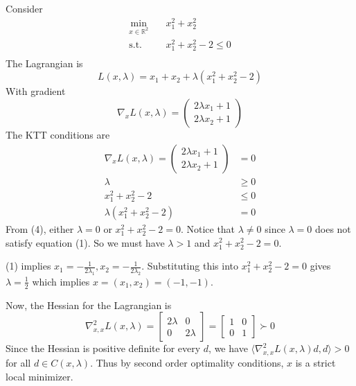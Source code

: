 \begin{example}
    Consider 
    \begin{align*}
        \min_{x \in \mathbb R^2} \quad &x_1^2 + x_2^2 \\
        \text{s.t.} \quad &x_1^2 + x_2^2 - 2\leq 0 \\
    \end{align*}
    The Lagrangian is $$L(x, \lambda) = x_1 + x_2 + \lambda(x_1^2 + x_2^2 - 2)$$
    With gradient
    $$\nabla_x L(x, \lambda) = \begin{pmatrix}
        2\lambda x_1 + 1 \\
        2\lambda x_2 + 1
    \end{pmatrix} $$
    The KTT conditions are 
    \begin{align*}
        \nabla_x L(x, \lambda) = \begin{pmatrix}
            2\lambda x_1 + 1 \\
            2\lambda x_2 + 1
        \end{pmatrix} &= 0 \tag{1}\\
        \lambda &\geq 0 \tag{2}\\
        x_1^2 + x_2^2 - 2 &\leq 0 \tag{3}\\
        \lambda(x_1^2 + x_2^2 - 2) &= 0 \tag{4}
    \end{align*}
    From (4), either $\lambda = 0$ or $x_1^2 + x_2^2 - 2 = 0$. Notice that $\lambda \neq 0$ since $\lambda = 0$ does not satisfy equation (1). So we must have $\lambda > 1$ and $x_1^2 + x_2^2 - 2 = 0$. 
    
    \bigskip 
    (1) implies $x_1 = - \frac{1}{2\lambda_1}, x_2 = - \frac{1}{2\lambda_2}$. Substituting this into $x_1^2 + x_2^2 - 2 = 0$ gives $\lambda = \frac{1}{2}$ which implies $x = (x_1,x_2) = (-1,-1)$. 

    \bigskip
    Now, the Hessian for the Lagrangian is $$\nabla^2_{x, x} L(x, \lambda) = \begin{bmatrix}
        2\lambda & 0 \\
        0 & 2\lambda
    \end{bmatrix} = \begin{bmatrix}
        1 & 0 \\
        0 & 1
    \end{bmatrix} \succ 0$$
    Since the Hessian is positive definite for every $d$, we have $\langle \nabla^2_{x, x} L(x, \lambda)d, d \rangle > 0$ for all $d \in C(x, \lambda)$. Thus by second order optimality conditions, $x$ is a strict local minimizer.
\end{example}

